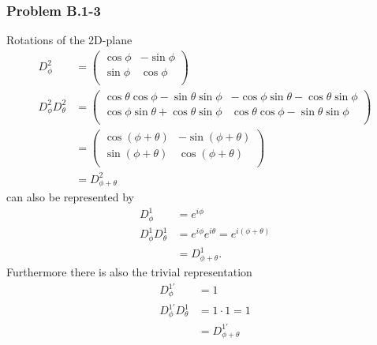 \documentclass[10pt,a4paper]{article}
\theoremstyle{definition}
\begin{document}
\subsubsection{Problem B.1-3}
Rotations of the 2D-plane
\begin{align}
D^2_\phi&=\left(
\begin{array}{cc}
\cos\phi& -\sin\phi  \\
\sin\phi & \cos\phi  \\
\end{array}
\right)\\
D^2_\phi D^2_\theta&= \left(
\begin{array}{cc}
 \cos\theta \cos\phi-\sin\theta \sin\phi  & -\cos\phi \sin\theta-\cos\theta\sin\phi \\
 \cos\phi\sin\theta+\cos\theta \sin\phi & \cos\theta \cos\phi
   -\sin\theta \sin\phi \\
\end{array}
\right)\\
&=\left(
\begin{array}{cc}
\cos(\phi+\theta)& -\sin(\phi+\theta)  \\
\sin(\phi+\theta) & \cos(\phi+\theta)  \\
\end{array}
\right)\\
&=D^2_{\phi+\theta}
\end{align}
can also be represented by
\begin{align}
D^1_\phi&=e^{i\phi}\\
D^1_\phi D^1_\theta&=e^{i\phi}e^{i\theta}=e^{i(\phi+\theta)}\\
&=D^1_{\phi+\theta}.
\end{align}
Furthermore there is also the trivial representation
\begin{align}
D^{1'}_\phi&=1\\
D^{1'}_\phi D^1_\theta&=1\cdot1=1\\
&=D^{1'}_{\phi+\theta}
\end{align}
\end{document}
